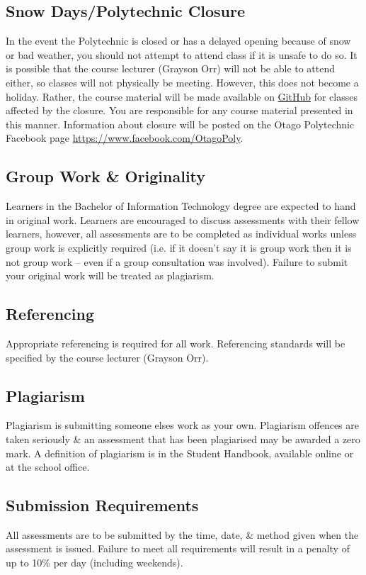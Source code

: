 \documentclass{article}
\begin{document}
\subsection*{Snow Days/Polytechnic Closure}
In the event the Polytechnic is closed or has a delayed opening because of snow or bad weather, you should not attempt to attend class if it is unsafe to do so. It is possible that the course lecturer (Grayson Orr) will not be able to attend either, so classes will not physically be meeting. However, this does not become a holiday. Rather, the course material will be made available on \href{https://github.com/otago-polytechnic-bit-courses/IN721-mobile-app-dev}{GitHub} for classes affected by the closure. You are responsible for any course material presented in this manner. Information about closure will be posted on the Otago Polytechnic Facebook page \href{https://www.facebook.com/OtagoPoly}{https://www.facebook.com/OtagoPoly}.

\subsection*{Group Work \& Originality}
Learners in the Bachelor of Information Technology degree are expected to hand in original work. Learners are encouraged to discuss assessments with their fellow learners, however, all assessments are to be completed as individual works unless group work is explicitly required (i.e. if it doesn’t say it is group work then it is not group work – even if a group consultation was involved). Failure to submit your original work will be treated as plagiarism.

\subsection*{Referencing}
Appropriate referencing is required for all work. Referencing standards will be specified by the course lecturer (Grayson Orr).

\subsection*{Plagiarism}
Plagiarism is submitting someone elses work as your own. Plagiarism offences are taken seriously \& an assessment that has been plagiarised may be awarded a zero mark. A definition of plagiarism is in the Student Handbook, available online or at the school office.

\subsection*{Submission Requirements}
All assessments are to be submitted by the time, date, \& method given when the assessment is issued. Failure to meet all requirements will result in a penalty of up to 10\% per day (including weekends).
\end{document}
